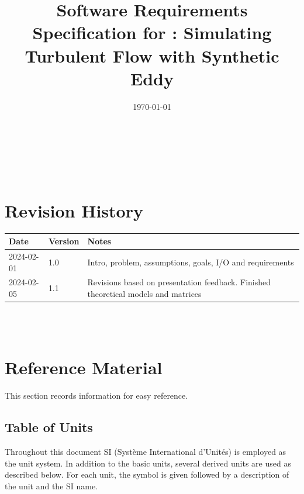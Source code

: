 \documentclass[12pt]{article}
\begin{document}
\title{Software Requirements Specification for \progname: Simulating Turbulent Flow with Synthetic Eddy}
\author{\authname}
\date{\today}
	
\maketitle

~\newpage


\tableofcontents

~\newpage

\section*{Revision History}

\begin{tabularx}{\textwidth}{p{3cm}p{2cm}X}
\toprule {\bf Date} & {\bf Version} & {\bf Notes}\\
\midrule
2024-02-01 & 1.0 & Intro, problem, assumptions, goals, I/O and requirements\\
2024-02-05 & 1.1 & Revisions based on presentation feedback. Finished theoretical models and matrices\\
\bottomrule
\end{tabularx}

~\\

~\newpage

\section{Reference Material}

This section records information for easy reference.

\subsection{Table of Units}

Throughout this document SI (Syst\`{e}me International d'Unit\'{e}s) is employed
as the unit system.  In addition to the basic units, several derived units are
used as described below.  For each unit, the symbol is given followed by a
description of the unit and the SI name.
~\newline
\end{document}
